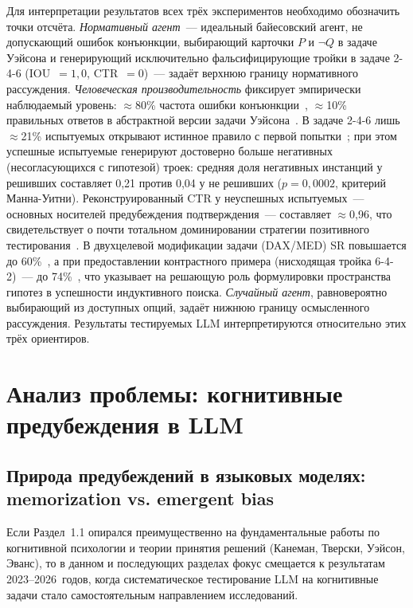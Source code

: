 Для интерпретации результатов всех трёх экспериментов необходимо обозначить точки отсчёта. \textit{Нормативный агент}~--- идеальный байесовский агент, не допускающий ошибок конъюнкции, выбирающий карточки $P$ и $\lnot Q$ в задаче Уэйсона и генерирующий исключительно фальсифицирующие тройки в задаче 2-4-6 (IOU~$= 1{,}0$, CTR~$= 0$)~--- задаёт верхнюю границу нормативного рассуждения. \textit{Человеческая производительность} фиксирует эмпирически наблюдаемый уровень: $\approx$80\% частота ошибки конъюнкции~\cite{tversky1983extensional}, $\approx$10\% правильных ответов в абстрактной версии задачи Уэйсона~\cite{wason1966reasoning}. В задаче 2-4-6 лишь $\approx$21\% испытуемых открывают истинное правило с первой попытки~\cite{wason1960failure}; при этом успешные испытуемые генерируют достоверно больше негативных (несогласующихся с гипотезой) троек: средняя доля негативных инстанций у решивших составляет 0{,}21 против 0{,}04 у не решивших ($p = 0{,}0002$, критерий Манна-Уитни). Реконструированный CTR у неуспешных испытуемых~--- основных носителей предубеждения подтверждения~--- составляет $\approx$0{,}96, что свидетельствует о почти тотальном доминировании стратегии позитивного тестирования~\cite{klayman1987confirmation}. В двухцелевой модификации задачи (DAX/MED) SR повышается до 60\%~\cite{tweney1980strategies}, а при предоставлении контрастного примера (нисходящая тройка 6-4-2)~--- до 74\%~\cite{gale2006dualgoal}, что указывает на решающую роль формулировки пространства гипотез в успешности индуктивного поиска. \textit{Случайный агент}, равновероятно выбирающий из доступных опций, задаёт нижнюю границу осмысленного рассуждения. Результаты тестируемых LLM интерпретируются относительно этих трёх ориентиров.

\section{Анализ проблемы: когнитивные предубеждения в LLM}

\subsection{Природа предубеждений в языковых моделях: memorization vs. emergent bias}

Если Раздел~1.1 опирался преимущественно на фундаментальные работы по когнитивной психологии и теории принятия решений (Канеман, Тверски, Уэйсон, Эванс), то в данном и последующих разделах фокус смещается к результатам 2023--2026~годов, когда систематическое тестирование LLM на когнитивные задачи стало самостоятельным направлением исследований.

